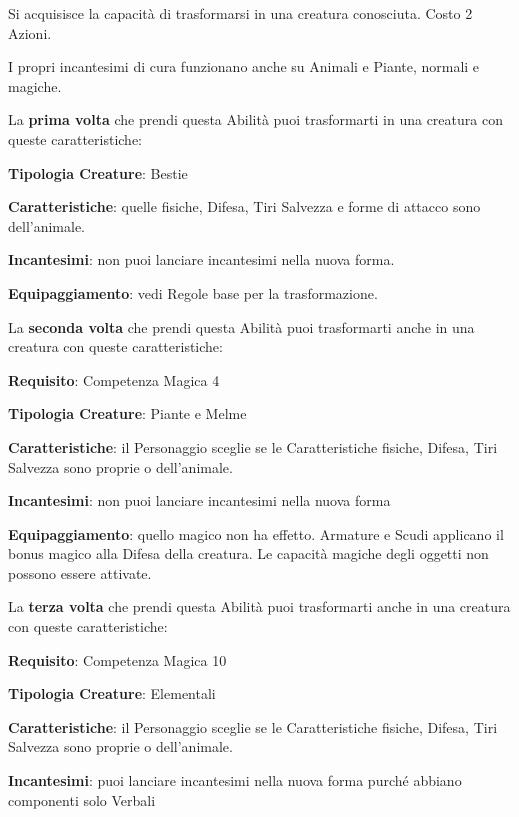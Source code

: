 \begin{multicols}{2}
Si acquisisce la capacità di trasformarsi in una creatura conosciuta. Costo 2 Azioni.

I propri incantesimi di cura funzionano anche su Animali e Piante, normali e magiche.

\medskip

La \textbf{prima volta} che prendi questa Abilità puoi trasformarti in una creatura con queste caratteristiche:

\medskip

\textbf{Tipologia Creature}: Bestie

\textbf{Caratteristiche}: quelle fisiche, Difesa, Tiri Salvezza e forme di attacco sono dell'animale.

\textbf{Incantesimi}: non puoi lanciare incantesimi nella nuova forma.

\textbf{Equipaggiamento}: vedi Regole base per la trasformazione.

\medskip

La \textbf{seconda volta} che prendi questa Abilità puoi trasformarti anche in una creatura con queste caratteristiche:

\medskip

\textbf{Requisito}: Competenza Magica 4

\textbf{Tipologia Creature}: Piante e Melme

\textbf{Caratteristiche}: il Personaggio sceglie se le Caratteristiche fisiche, Difesa, Tiri Salvezza sono proprie o dell'animale.

\textbf{Incantesimi}: non puoi lanciare incantesimi nella nuova forma

\textbf{Equipaggiamento}: quello magico non ha effetto. Armature e Scudi applicano il bonus magico alla Difesa della creatura. Le capacità magiche degli oggetti non possono essere attivate.

\medskip

La \textbf{terza volta} che prendi questa Abilità puoi trasformarti anche in una creatura con queste caratteristiche:

\medskip

\textbf{Requisito}: Competenza Magica 10

\textbf{Tipologia Creature}: Elementali

\textbf{Caratteristiche}: il Personaggio sceglie se le Caratteristiche fisiche, Difesa, Tiri Salvezza sono proprie o dell'animale.

\textbf{Incantesimi}: puoi lanciare incantesimi nella nuova forma purché abbiano componenti solo Verbali


\end{multicols}
